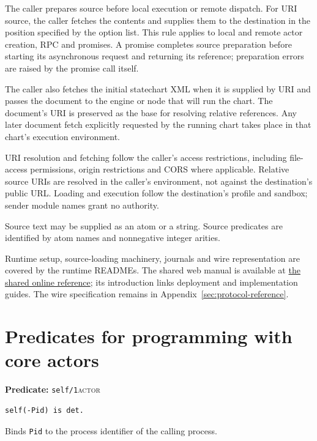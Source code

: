 The caller prepares source before local execution or remote dispatch. For
URI source, the caller fetches the contents and supplies them to the
destination in the position specified by the option list. This rule applies
to local and remote actor creation, RPC and promises. A promise completes
source preparation before starting its asynchronous request and returning its
reference; preparation errors are raised by the promise call itself.

The caller also fetches the initial statechart XML when it is supplied by URI
and passes the document to the engine or node that will run the chart. The
document's URI is preserved as the base for resolving relative references.
Any later document fetch explicitly requested by the running chart takes
place in that chart's execution environment.

URI resolution and fetching follow the caller's access restrictions,
including file-access permissions, origin restrictions and CORS where
applicable. Relative source URIs are resolved in the caller's environment,
not against the destination's public URL. Loading and execution follow the
destination's profile and sandbox; sender module names grant no authority.

Source text may be supplied as an atom or a string. Source predicates are
identified by atom names and nonnegative integer arities.

Runtime setup, source-loading machinery, journals and wire representation are
covered by the runtime READMEs. The shared web manual is available at
\href{https://github.com/torbjornlager/trinity-demonstrator/blob/main/web/manual.html}{the shared online reference};
its introduction links deployment and implementation guides.
The wire specification remains in Appendix~\ref{sec:protocol-reference}.

\section{Predicates for programming with core actors}\label{sec:actor-API}

\noindent \textbf{Predicate:} \texttt{self/\allowbreak{}1}\hfill\textsc{actor}

\begin{verbatim}
self(-Pid) is det.
\end{verbatim}

\noindent Binds \texttt{Pid} to the process identifier of the calling process.\\

